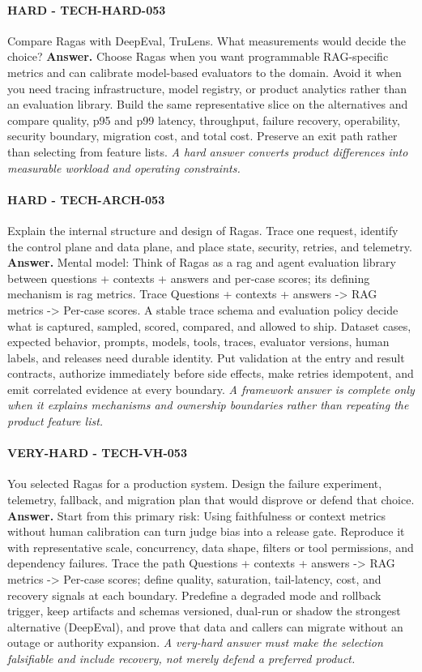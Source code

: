 \paragraph{HARD - TECH-HARD-053} Compare Ragas with DeepEval, TruLens. What measurements would decide the choice?
\textbf{Answer.} Choose Ragas when you want programmable RAG-specific metrics and can calibrate model-based evaluators to the domain. Avoid it when you need tracing infrastructure, model registry, or product analytics rather than an evaluation library. Build the same representative slice on the alternatives and compare quality, p95 and p99 latency, throughput, failure recovery, operability, security boundary, migration cost, and total cost. Preserve an exit path rather than selecting from feature lists.
\textit{A hard answer converts product differences into measurable workload and operating constraints.}
\paragraph{HARD - TECH-ARCH-053} Explain the internal structure and design of Ragas. Trace one request, identify the control plane and data plane, and place state, security, retries, and telemetry.
\textbf{Answer.} Mental model: Think of Ragas as a rag and agent evaluation library between questions + contexts + answers and per-case scores; its defining mechanism is rag metrics. Trace Questions + contexts + answers -> RAG metrics -> Per-case scores. A stable trace schema and evaluation policy decide what is captured, sampled, scored, compared, and allowed to ship. Dataset cases, expected behavior, prompts, models, tools, traces, evaluator versions, human labels, and releases need durable identity. Put validation at the entry and result contracts, authorize immediately before side effects, make retries idempotent, and emit correlated evidence at every boundary.
\textit{A framework answer is complete only when it explains mechanisms and ownership boundaries rather than repeating the product feature list.}
\paragraph{VERY-HARD - TECH-VH-053} You selected Ragas for a production system. Design the failure experiment, telemetry, fallback, and migration plan that would disprove or defend that choice.
\textbf{Answer.} Start from this primary risk: Using faithfulness or context metrics without human calibration can turn judge bias into a release gate. Reproduce it with representative scale, concurrency, data shape, filters or tool permissions, and dependency failures. Trace the path Questions + contexts + answers -> RAG metrics -> Per-case scores; define quality, saturation, tail-latency, cost, and recovery signals at each boundary. Predefine a degraded mode and rollback trigger, keep artifacts and schemas versioned, dual-run or shadow the strongest alternative (DeepEval), and prove that data and callers can migrate without an outage or authority expansion.
\textit{A very-hard answer must make the selection falsifiable and include recovery, not merely defend a preferred product.}
